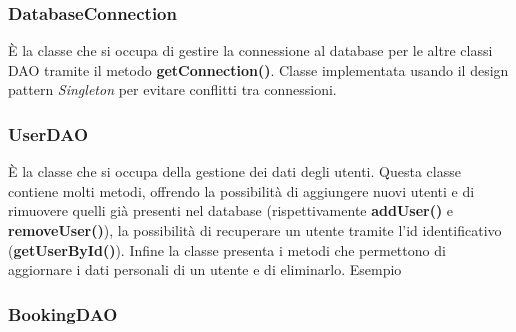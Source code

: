 \documentclass[10pt]{article}
\begin{document}
\subsubsection{DatabaseConnection}

\`E la classe che si occupa di gestire la connessione al database per le altre classi DAO tramite il metodo \textbf{getConnection()}. Classe implementata usando il design pattern \textit{Singleton} per evitare conflitti tra connessioni.

\subsubsection{UserDAO}

\`E la classe che si occupa della gestione dei dati degli utenti. Questa classe contiene molti metodi, offrendo la possibilit\`a di aggiungere nuovi utenti e di rimuovere quelli gi\`a presenti nel database (rispettivamente \textbf{addUser()} e \textbf{removeUser()}), la possibilit\`a di recuperare un utente tramite l'id identificativo (\textbf{getUserById()}). Infine la classe presenta i metodi che permettono di aggiornare i dati personali di un utente e di eliminarlo.
\newline
Esempio

\subsubsection{BookingDAO}
\end{document}
